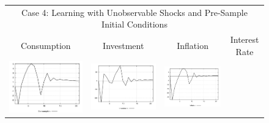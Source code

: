\begin{figure}
\begin{tabular}{cccc}
\multicolumn{4}{c}{Case 4: Learning with Unobservable Shocks and Pre-Sample Initial Conditions}\\
Consumption & Investment & Inflation & Interest Rate \\ 
\includegraphics[scale=0.22]{results_wlsinit/Consumption_techshock_irf.png} & 
\includegraphics[scale=0.22]{results_wlsinit/Investment_techshock_irf.png} & 
\includegraphics[scale=0.22]{results_wlsinit/Inflation_techshock_irf.png} & 

\end{tabular}
\end{figure}
